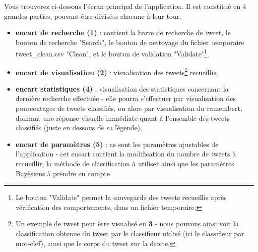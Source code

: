 \documentclass[pdftex,12pt,a4paper]{report}
\begin{document}
\begin{spacing}{1.2}
Vous trouverez ci-dessous l'écran principal de l'application. Il est constitué en 4 grandes parties, pouvant être divisées chacune à leur tour.
\begin{itemize}
\item{\textbf{encart de recherche (1)} : contient la barre de recherche de tweet, le bouton de recherche "Search", le bouton de nettoyage du fichier temporaire tweet\_clean.csv "Clean", et le bouton de validation "Validate"\footnote{Le bouton "Validate" permet la sauvegarde des tweets recueillis après vérification des comportements, dans un fichier temporaire.},}
\item{\textbf{encart de visualisation (2)} : visualisation des tweets\footnote{Un exemple de tweet peut être visualisé en \textbf{3} - nous pouvons ainsi voir la classification obtenue du tweet par le classifieur utilisé (ici le classifieur par mot-clef), ainsi que le corps du tweet sur la droite.} recueillis,}
\item{\textbf{encart statistiques (4)} : visualisation des statistiques concernant la dernière recherche effectuée - elle pourra s'effectuer par visualisation des pourcentages de tweets classifiés, ou alors par visualisation du camembert, donnant une réponse visuelle immédiate quant à l'ensemble des tweets classifiés (juste en dessous de sa légende),}
\item{\textbf{encart de paramètres (5)} : ce sont les paramètres ajustables de l'application - cet encart contient la modification du nombre de tweets à recueillir, la méthode de classification à utiliser ainsi que les paramètres Bayèsiens à prendre en compte.}
\end{itemize}



\end{spacing}
\end{document}
